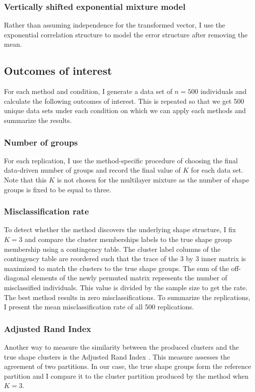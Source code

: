 \subsubsection{Vertically shifted exponential mixture model}
Rather than assuming independence for the transformed vector, I use the exponential correlation structure to model the error structure after removing the mean.

\subsection{Outcomes of interest}
For each method and condition, I generate a data set of $n=500$ individuals and calculate the following outcomes of interest. This is repeated so that we get 500 unique data sets under each condition on which we can apply each methods and summarize the results.

\subsubsection{Number of groups}
For each replication, I use the method-specific procedure of choosing the final data-driven number of groups and record the final value of $K$ for each data set. Note that this $K$ is not chosen for the multilayer mixture as the number of shape groups is fixed to be equal to three.

\subsubsection{Misclassification rate}
To detect whether the method discovers the underlying shape structure, I fix $K=3$ and compare the cluster memberships labels to the true shape group membership using a contingency table. The cluster label columns of the contingency table are reordered such that the trace of the 3 by 3 inner matrix is maximized to match the clusters to the true shape groups. The sum of the off-diagonal elements of the newly permuted matrix represents the number of misclassified individuals. This value is divided by the sample size to get the rate. The best method results in zero misclassifications. To summarize the replications, I present the mean misclassification rate of all 500 replications.

\subsubsection{Adjusted Rand Index}
Another way to measure the similarity between the produced clusters and the true shape clusters is the Adjusted Rand Index \cite{hubert1985,mulligan1985}. This measure assesses the agreement of two partitions. In our case, the true shape groups form the reference partition and I compare it to the cluster partition produced by the method when $K=3$.
 
